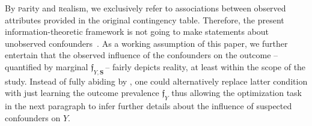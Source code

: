 \documentclass[10pt]{article}
\newcommand{\prob}[1]{\mathfrak{#1}}
\begin{document}
By \textsc{p}arity and \textsc{r}ealism, we exclusively refer to  associations between observed attributes provided  in the original contingency table. Therefore, the present information-theoretic framework is not going to make statements about unobserved confounders~\cite{liu2013introduction,d2019multi}.
%
As a working assumption of this paper, we further entertain that the observed influence of the confounders on the outcome --\,quantified by marginal $\prob f_{Y,\boldsymbol S}$\,-- fairly depicts reality, at least within the scope of the study.
Instead of fully abiding by ,
one could alternatively replace latter condition with just learning the outcome prevalence  $\prob f_Y$ thus allowing  the optimization task in the next paragraph to infer further details about the influence of suspected confounders on $Y$.



\usetikzlibrary{shapes.misc}
\end{document}
